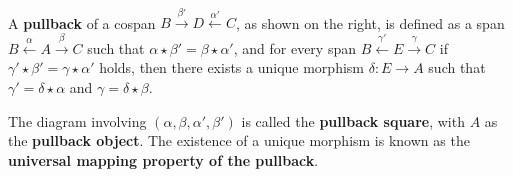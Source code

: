 \begin{definition}
    \label{def:cat:pb}
    \ \newline
\noindent
\begin{minipage}{0.7\textwidth}  
   A \textbf{pullback} of a cospan \(B \overset{\beta'}{\rightarrow} D \overset{\alpha'}{\leftarrow} C \), as shown on the right, is defined as a span \( B \overset{\alpha}{\leftarrow} A \overset{\beta}{\rightarrow} C \) such that \( \alpha \star \beta' = \beta \star \alpha' \), and for every span \( B \overset{\gamma'}{\leftarrow} E \overset{\gamma}{\rightarrow} C \) if \(\gamma' \star \beta' = \gamma \star \alpha'\) holds, then there exists a unique morphism \(\delta: E \to A\) such that $\gamma' = \delta \star \alpha$ and $\gamma = \delta \star \beta$. 
\end{minipage}
\hfill
\begin{minipage}{0.299\textwidth}
    \hfill
{}
\end{minipage}
The diagram involving \( (\alpha, \beta, \alpha', \beta') \) is called the \textbf{pullback square}, with \(A\) as the \textbf{pullback object}. The existence of a unique morphism is known as the \textbf{universal mapping property of the pullback}.
\end{definition} 


